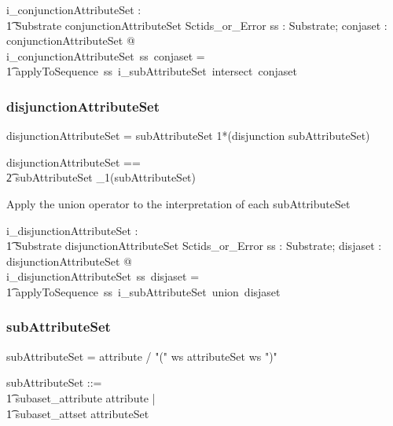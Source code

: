 \documentclass{article}
\def\bnf#1{{\scriptsize {{#1}} }}
\begin{document}
\begin{gendef}
    i\_conjunctionAttributeSet : \\
\t1 Substrate \fun conjunctionAttributeSet \fun Sctids\_or\_Error
\where
   \forall ss : Substrate;  conjaset : conjunctionAttributeSet @ \\
i\_conjunctionAttributeSet~ss~conjaset = \\
\t1 applyToSequence~ss~i\_subAttributeSet~intersect~conjaset
\end{gendef}


\subsubsection{disjunctionAttributeSet}
\begin{framed}
\noindent
\bnf{disjunctionAttributeSet = subAttributeSet 1*(disjunction subAttributeSet)}
\end{framed}

\begin{zed}
disjunctionAttributeSet == \\
\t2 subAttributeSet \cross \seq_1(subAttributeSet)
\end{zed}


Apply the union operator to the interpretation of each  subAttributeSet

\begin{gendef}
    i\_disjunctionAttributeSet : \\
\t1 Substrate \fun disjunctionAttributeSet \fun Sctids\_or\_Error
\where
   \forall ss : Substrate;  disjaset : disjunctionAttributeSet @ \\
i\_disjunctionAttributeSet~ss~disjaset = \\
\t1 applyToSequence~ss~i\_subAttributeSet~union~disjaset
\end{gendef}

\subsubsection{subAttributeSet}
\begin{framed}
\noindent
\bnf{subAttributeSet = attribute / "(" ws attributeSet ws ")"}
\end{framed}

\begin{zed}
subAttributeSet ::= \\
\t1 subaset\_attribute \ldata attribute \rdata | \\
\t1 subaset\_attset \ldata attributeSet \rdata
\end{zed}
\end{document}
